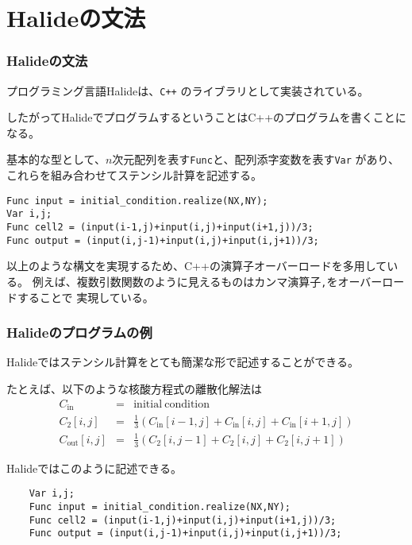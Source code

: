 \documentclass[dvipdfmx,cjk]{beamer}
\begin{document}
\section{Halideの文法} 
\begin{frame}[fragile]\frametitle{Halideの文法}

プログラミング言語Halideは、{\tt C++} のライブラリとして実装されている。

したがってHalideでプログラムするということはC++のプログラムを書くことになる。

基本的な型として、$n$次元配列を表す{\tt Func}と、配列添字変数を表す{\tt Var}
があり、これらを組み合わせてステンシル計算を記述する。

\pause

\begingroup
    \fontsize{8pt}{9pt}\selectfont
\begin{verbatim}
Func input = initial_condition.realize(NX,NY);
Var i,j;
Func cell2 = (input(i-1,j)+input(i,j)+input(i+1,j))/3;
Func output = (input(i,j-1)+input(i,j)+input(i,j+1))/3;
\end{verbatim}
\endgroup

\pause

以上のような構文を実現するため、C++の演算子オーバーロードを多用している。
例えば、複数引数関数のように見えるものはカンマ演算子{\tt ,}をオーバーロードすることで
実現している。

\end{frame}


\begin{frame}[fragile]\frametitle{Halideのプログラムの例}

Halideではステンシル計算をとても簡潔な形で記述することができる。

\pause

たとえば、以下のような核酸方程式の離散化解法は
\begin{eqnarray}
C_\mathrm{in} &=& \mathrm{initial~condition} \\
C_2 [i,j] &=& \frac{1}{3}\left(C_\mathrm{in}[i-1,j] + C_\mathrm{in}[i,j] + C_\mathrm{in}[i+1,j]\right) \\
C_\mathrm{out} [i,j] &=& \frac{1}{3}\left(C_\mathrm{2}[i,j-1] + C_\mathrm{2}[i,j] + C_\mathrm{2}[i,j+1]\right)
\end{eqnarray}

\pause

Halideではこのように記述できる。
\begin{center}
\begingroup
    \fontsize{9pt}{10pt}\selectfont
\begin{verbatim}
    Var i,j;
    Func input = initial_condition.realize(NX,NY);
    Func cell2 = (input(i-1,j)+input(i,j)+input(i+1,j))/3;
    Func output = (input(i,j-1)+input(i,j)+input(i,j+1))/3;
\end{verbatim}
\endgroup
\end{center}

\end{frame}
\end{document}

